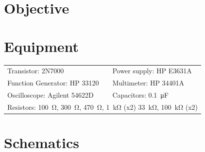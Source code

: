 

\section{Objective}
\label{sec:objective}


\section{Equipment}
\label{sec:equipment}

\begin{tabular}{ll}
  \centering
  Transistor: 2N7000               & Power supply: HP E3631A            \\
  Function Generator: HP 33120 & Multimeter: HP 34401A              \\
  Oscilloscope: Agilent 54622D & Capacitors: \SI{0.1}{\micro\farad} \\
  \multicolumn{2}{l}{Resistors: \SI{100}{\ohm}, \SI{300}{\ohm}, \SI{470}{\ohm}, \SI{1}{\kilo\ohm} (x2) \SI{33}{\kilo\ohm}, \SI{100}{\kilo\ohm} (x2)} \\
\end{tabular}

\section{Schematics}
\label{sec:schematics}


